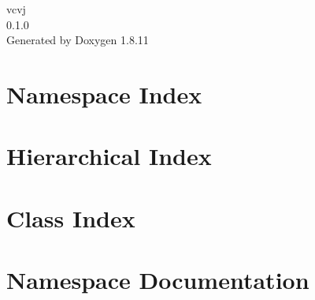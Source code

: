 \documentclass[twoside]{book}
\newcommand{\+}{\discretionary{\mbox{\scriptsize$\hookleftarrow$}}{}{}}
\newcommand{\clearemptydoublepage}{%
  \newpage{\pagestyle{empty}\cleardoublepage}%
}
\begin{document}
\hypersetup{pageanchor=false,
             bookmarksnumbered=true,
             pdfencoding=unicode
            }
\begin{titlepage}
\vspace*{7cm}
\begin{center}%
{\Large vcvj \\[1ex]\large 0.\+1.\+0 }\\
\vspace*{1cm}
{\large Generated by Doxygen 1.8.11}\\
\end{center}
\end{titlepage}
\clearemptydoublepage
\tableofcontents
\clearemptydoublepage
{}
\hypersetup{pageanchor=true}

\chapter{Namespace Index}

\chapter{Hierarchical Index}

\chapter{Class Index}

\chapter{Namespace Documentation}







\end{document}
